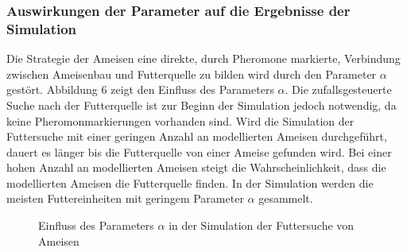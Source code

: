 \documentclass[a4paper, 11pt]{article}
\begin{document}
\subsubsection{Auswirkungen der Parameter auf die Ergebnisse der Simulation}
Die Strategie der Ameisen eine direkte, durch Pheromone markierte, Verbindung zwischen Ameisenbau und Futterquelle zu bilden wird durch den Parameter $\alpha$ gestört. Abbildung 6 zeigt den Einfluss des Parameters $\alpha$. Die zufallsgesteuerte Suche nach der Futterquelle ist zur Beginn der Simulation jedoch notwendig, da keine Pheromonmarkierungen vorhanden sind. Wird die Simulation der Futtersuche mit einer geringen Anzahl an modellierten Ameisen durchgeführt, dauert es länger bis die Futterquelle von einer Ameise gefunden wird. Bei einer hohen Anzahl an modellierten Ameisen steigt die Wahrscheinlichkeit, dass die modellierten Ameisen die Futterquelle finden. In der Simulation werden die meisten Futtereinheiten mit geringem Parameter $\alpha$ gesammelt. \newline
\begin{figure}[h]
	\begin{center}
	\end{center}
	\hspace{1in}\parbox{4in}{\caption[Einfluss des Parameters $\alpha$ in der Simulation der Futtersuche von Ameisen]{Einfluss des Parameters $\alpha$ in der Simulation der Futtersuche von Ameisen}}
	\label{acomodabb2}
\end{figure}
\end{document}
